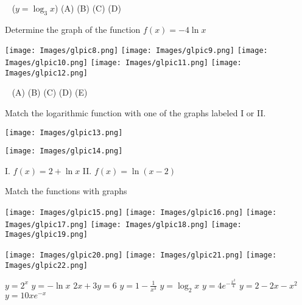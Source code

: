 \documentclass[12pt,
]{exam}
\newcounter{quest}
\begin{document}
\begin{questions}
  ~\hspace{0.4cm} ($y=\log_3 x$) \hspace{2.2cm} (A)  \hspace{2.8cm} (B) \hspace{3cm} (C) \hspace{3cm} (D)


\question
Determine the graph of the function $f(x)=-4 \ln x$

\texttt{[image: Images/glpic8.png]}
     \texttt{[image: Images/glpic9.png]}
          \texttt{[image: Images/glpic10.png]}
               \texttt{[image: Images/glpic11.png]}
                    \texttt{[image: Images/glpic12.png]}
   
  ~\hspace{1cm} (A) \hspace{2.2cm} (B)  \hspace{2.8cm} (C) \hspace{3cm} (D) \hspace{3cm} (E)

\newpage

\question
Match the logarithmic function with one of the graphs labeled I or II.
\begin{multicols}{3}
\begin{center}
\texttt{[image: Images/glpic13.png]}
\end{center}
\columnbreak
     \texttt{[image: Images/glpic14.png]}
 \columnbreak
 
         I. $f(x)=2+\ln x$ 
         \newline
           II. $f(x)=\ln (x-2)$
\end{multicols}

\question 
Match the functions with graphs

\texttt{[image: Images/glpic15.png]}
     \texttt{[image: Images/glpic16.png]}
          \texttt{[image: Images/glpic17.png]}
               \texttt{[image: Images/glpic18.png]}
                    \texttt{[image: Images/glpic19.png]}

\texttt{[image: Images/glpic20.png]}
     \texttt{[image: Images/glpic21.png]}
          \texttt{[image: Images/glpic22.png]} 
          
      \begin{choices}
      \begin{multicols}{4}
          \choice $y=2^x$   
          \choice $y=-\ln x$ \hspace{0.2cm} 
          \columnbreak
       \choice $2x+3y=6$   
        \choice  $y=1-\frac{1}{x^3}$
        \columnbreak
     \choice $y=\log_2 x $    \choice   $y=4e^{-\frac{x^2}{4}}$ 
     \columnbreak
             \choice  $y=2-2x-x^2$     \choice  $y=10xe^{-x}$              
         \end{multicols}
          \end{choices}
\vspace{0.3cm}


\end{questions}
\end{document}

